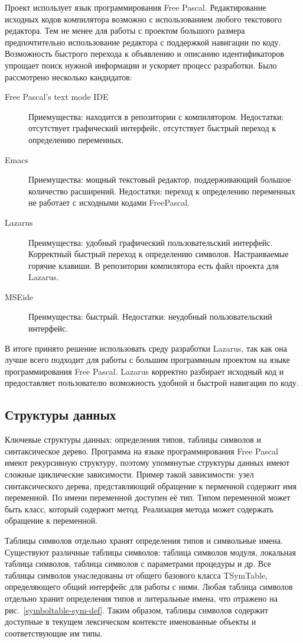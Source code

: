 \documentclass{imcs}
\begin{document}
Проект использует язык программирования Free Pascal. Редактирование исходных кодов
компилятора возможно с использованием любого текстового редактора. Тем не менее
для работы с проектом большого размера предпочтительно использование редактора с
поддержкой навигации по коду. Возможность быстрого перехода к объявлению и описанию
идентификаторов упрощает поиск нужной информации и ускоряет процесс разработки.
Было рассмотрено несколько кандидатов:
\begin{description}
  \item[Free Pascal's text mode IDE] Приемущества: находится в репозитории с 
компилятором. Недостатки: отсутствует графический интерфейс, отсутствует
быстрый переход к определению переменных.
  \item[Emacs] Приемущества: мощный текстовый редактор, поддерживающий большое
количество расширений. Недостатки: переход к определению переменных не работает
с исходными кодами FreePascal.
  \item[Lazarus] Преимущества: удобный графический пользовательский интерфейс.
Корректный быстрый переход к определению символов. Настраиваемые горячие клавиши.
В репозитории компилятора есть файл проекта для Lazarus.
  \item[MSEide] Преимущества: быстрый. Недостатки: неудобный 
пользовательский интерфейс.
\end{description} 
В итоге принято решение использовать среду разработки Lazarus, так как она
лучше всего подходит для работы с большим программным проектом на
языке программирования Free Pascal. Lazarus корректно разбирает
исходный код и предоставляет пользователю возможность удобной и
быстрой навигации по коду.

\subsection{Структуры данных}

Ключевые структуры данных: определения типов, таблицы символов и
синтаксическое дерево. Программа на языке программирования Free Pascal имеют рекурсивную структуру,
поэтому упомянутые структуры данных имеют сложные циклические зависимости. Пример такой 
зависимости: узел синтаксического дерева, представляющий обращение к перменной содержит имя
переменной. По имени переменной доступен её тип. Типом переменной может быть класс, который
содержит метод. Реализация метода  может содержать обращение к переменной.

Таблицы символов отдельно хранят определения типов и символьные имена. Существуют 
различные таблицы символов: таблица символов модуля, локальная таблица символов, таблица
символов с параметрами процедуры и др. Все таблицы символов унаследованы от общего
базового класса TSymTable, определяющего общий интерфейс для работы с ними. Любая таблица символов отдельно
хранит определения типов и литеральные имена, что отражено на рис.~\ref{symboltable-sym-def}.
Таким образом, таблицы символов содержит доступные в текущем лексическом контексте
именованные объекты и соответствующие им типы.
\end{document}
